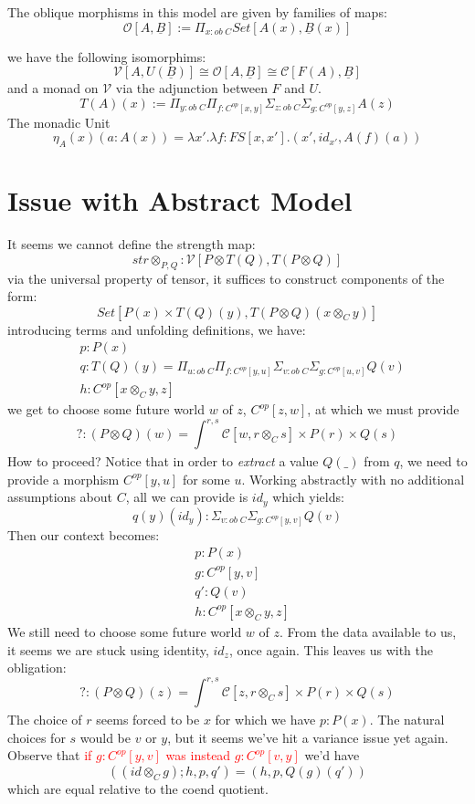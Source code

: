 \documentclass{article}
\newcommand{\red}[1]{\textcolor{red}{#1}}
\begin{document}
The oblique morphisms in this model are given by families of maps:
\[
    \mathcal{O}[A , \underline{B}] := \Pi_{x : ob \; C} Set[A(x) , \underline{B}(x)]   
\]

we have the following isomorphims:
\[
    \mathcal{V}[A , U(\underline{B})] \cong \mathcal{O}[A , \underline{B}] \cong \mathcal{C}[F(A) , \underline{B}]   
\]
and a monad on $\mathcal{V}$ via the adjunction between $F$ and $U$.
\[
    T(A)(x) := \Pi_{y : ob \; C}\Pi_{f : C^{op}[ x , y]}\Sigma_{z : ob \;C}\Sigma_{g : C^{op}[ y , z ]}A(z) 
\]
The monadic Unit
\[
    \eta_A(x)(a:A(x)) = \lambda x' . \lambda f : FS[x , x'] . (x' , id_{x'}, A(f)(a))    
\]
\section{Issue with Abstract Model}
It seems we cannot define the strength map:
\[
    str\otimes_{P,Q} : \mathcal{V}[ P \otimes T(Q), T (P \otimes Q)]
\]
via the universal property of tensor, it suffices to construct components of the form:
\[
    Set[P(x) \times T(Q)(y) ,T(P \otimes Q)(x \otimes_C y) ]
\]
introducing terms and unfolding definitions, we have:
\begin{align*}
    &p : P(x)\\
    &q : T(Q)(y) = \Pi_{u : ob \; C}\Pi_{f : C^{op}[ y , u]}\Sigma_{v : ob \;C}\Sigma_{g : C^{op}[ u , v ]}Q(v)\\
    &h : C^{op}[x\otimes_C y , z]
\end{align*}
we get to choose some future world $w$ of $z$, $C^{op}[z , w]$, 
at which we must provide 
\[ 
    ? : (P \otimes Q)(w) = \int_{}^{r,s} \mathcal{C}[ w , r \otimes_C s ] 
\times P(r) \times Q(s)
\]
How to proceed? Notice that in order to \textit{extract} a value $Q(\_)$ from $q$,
we need to provide a morphism $C^{op}[y , u]$ for some $u$. 
Working abstractly with no additional assumptions about $C$, all we can provide is $id_y$ which yields:
\[
    q(y)(id_y) : \Sigma_{v : ob \;C}\Sigma_{g : C^{op}[ y , v ]}Q(v)  
\]
Then our context becomes:
\begin{align*}
    &p : P(x)\\
    &g : C^{op}[ y , v ]\\
    &q' : Q(v)\\
    &h : C^{op}[x\otimes_C y , z]
\end{align*}
We still need to choose some future world $w$ of $z$.
From the data available to us, it seems we are stuck using identity, $id_z$, once again.
This leaves us with the obligation:
\[
    ? : (P \otimes Q)(z) = \int_{}^{r,s} \mathcal{C}[ z , r \otimes_C s ] 
\times P(r) \times Q(s)
\]
The choice of $r$ seems forced to be $x$ for which we have $p: P(x)$.
The natural choices for $s$ would be $v$ or $y$, but it seems we've hit a variance issue yet again.
Observe that \red{if $g: C^{op}[ y , v ]$ was instead $g : C^{op}[v , y]$} we'd have
\[
    ((id \otimes_C g) ;h , p , q') = (h , p , Q(g)(q'))
\]
which are equal relative to the coend quotient.
\end{document}
